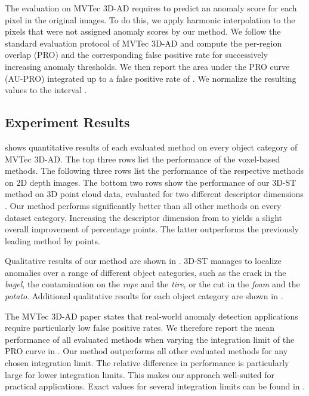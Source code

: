 \documentclass[twoside,11pt]{article}
\newcommand{\methodname}{{3D-ST}}
\begin{document}
The evaluation on MVTec 3D-AD requires to predict an anomaly score for each pixel in the original  images. To do this, we apply harmonic interpolation \citep{evans2010harmonicinterp} to the pixels that were not assigned anomaly scores by our method. We follow the standard evaluation protocol of MVTec 3D-AD and compute the per-region overlap (PRO) \citep{Bergmann_2021_IJCV} and the corresponding false positive rate for successively increasing anomaly thresholds. We then report the area under the PRO curve (AU-PRO) integrated up to a false positive rate of . We normalize the resulting values to the interval .

\subsection{Experiment Results}

 shows quantitative results of each evaluated method on every object category of MVTec 3D-AD. The top three rows list the performance of the voxel-based methods. The following three rows list the performance of the respective methods on 2D depth images. The bottom two rows show the performance of our \methodname{} method on 3D point cloud data, evaluated for two different descriptor dimensions . Our method performs significantly better than all other methods on every dataset category. Increasing the descriptor dimension from  to  yields a slight overall improvement of  percentage points. The latter outperforms the previously leading method by  points.

Qualitative results of our method are shown in . \methodname{} manages to localize anomalies over a range of different object categories, such as the crack in the \textit{bagel}, the contamination on the \textit{rope} and the \textit{tire}, or the cut in the \textit{foam} and the \textit{potato}. Additional qualitative results for each object category are shown in .

The MVTec 3D-AD paper states that real-world anomaly detection applications require particularly low false positive rates. We therefore report the mean performance of all evaluated methods when varying the integration limit of the PRO curve in . Our method outperforms all other evaluated methods for any chosen integration limit. The relative difference in performance is particularly large for lower integration limits. This makes our approach well-suited for practical applications. Exact values for several integration limits can be found in .
\end{document}
